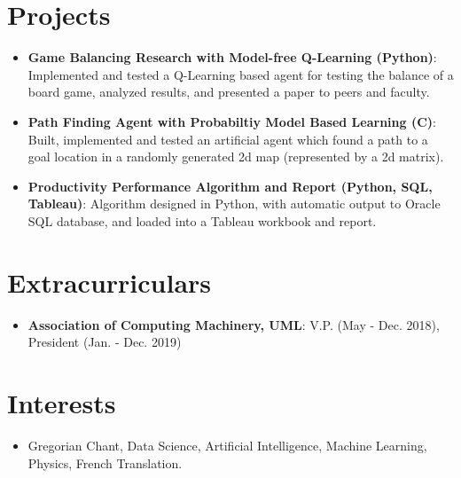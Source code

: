 \documentclass[letterpaper,11pt]{article}
\newcommand{\resumeItem}[2]{
  \item\small{
    \textbf{#1}{: #2 \vspace{-2pt}}
  }
}
\newcommand{\resumeSubItem}[2]{\resumeItem{#1}{#2}\vspace{-4pt}}
\newcommand{\resumeSubHeadingListStart}{\begin{itemize}[leftmargin=*]}
\newcommand{\resumeSubHeadingListEnd}{\end{itemize}}
\begin{document}
\section{Projects}
  \resumeSubHeadingListStart
  \resumeSubItem{Game Balancing Research with Model-free Q-Learning (Python)}
  {Implemented and tested a Q-Learning based agent for testing the balance of a board game, analyzed results, and presented a paper to peers and faculty.}
    \resumeSubItem{Path Finding Agent with Probabiltiy Model Based Learning (C)}
      {Built, implemented and tested an artificial agent which found a path to a goal location in a randomly generated 2d map (represented by a 2d matrix).}
    \resumeSubItem{Productivity Performance Algorithm and Report (Python, SQL, Tableau)}
      {Algorithm designed in Python, with automatic output to Oracle SQL database, and loaded into a Tableau workbook and report.}
  \resumeSubHeadingListEnd
  
  
\section{Extracurriculars}
  \resumeSubHeadingListStart
    \item{
      \textbf{Association of Computing Machinery, UML}{: V.P. (May - Dec. 2018), President (Jan. - Dec. 2019)}
      }
  \resumeSubHeadingListEnd
  
\section{Interests}
  \resumeSubHeadingListStart
    \item{
      {Gregorian Chant, Data Science, Artificial Intelligence, Machine Learning, Physics, French Translation.}
    }
  \resumeSubHeadingListEnd





\end{document}
